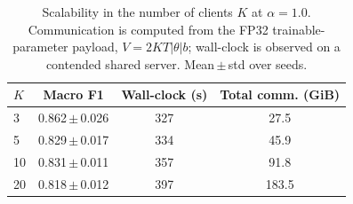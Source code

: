 \begin{table}[t]
\caption{Scalability in the number of clients $K$ at $\alpha{=}1.0$.
Communication is computed from the FP32 trainable-parameter payload,
$V=2KT|\theta|b$; wall-clock is observed on a contended shared server.
Mean\,$\pm$\,std over seeds.}
\label{tab:clients}
\centering\footnotesize
\setlength\tabcolsep{5pt}
\begin{tabular}{lccc}
\toprule
$K$ & Macro F1 & Wall-clock (s) & Total comm. (GiB)\\
\midrule
3 & 0.862\,$\pm$\,0.026 & 327 & 27.5 \\
5 & 0.829\,$\pm$\,0.017 & 334 & 45.9 \\
10 & 0.831\,$\pm$\,0.011 & 357 & 91.8 \\
20 & 0.818\,$\pm$\,0.012 & 397 & 183.5 \\
\bottomrule
\end{tabular}
\end{table}

